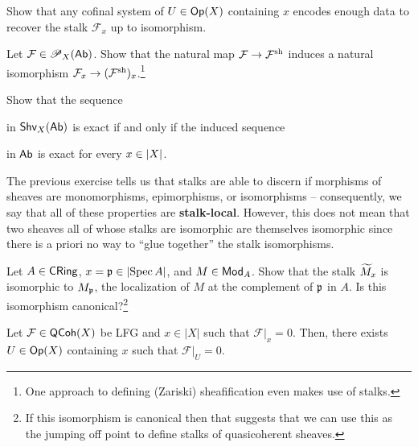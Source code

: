 \documentclass[11pt]{article}
\renewcommand{\F}{\mathcal{F}}
\newcommand{\G}{\mathcal{G}}
\begin{document}
\begin{exercise}
Show that any cofinal system of $U\in\operatorname{\mathsf{Op}}(X)$ containing $x$ encodes enough data to recover the stalk $\F_x$ up to isomorphism.
\end{exercise}

\begin{exercise}
Let $\F\in\Pre_X(\Ab)$. Show that the natural map $\F\to\F^{\sh}$ induces a natural isomorphism $\F_x\to(\F^{\sh})_x$.\footnote{One approach to defining (Zariski) sheafification even makes use of stalks.}
\end{exercise}

\begin{exercise}
Show that the sequence
\begin{center}
\end{center}
in $\operatorname{\mathsf{Shv}}_X(\operatorname{\mathsf{Ab}})$ is exact if and only if the induced sequence
\begin{center}
\end{center}
in $\operatorname{\mathsf{Ab}}$ is exact for every $x\in\left\lvert X\right\rvert$.
\end{exercise}

\begin{remark}
The previous exercise tells us that stalks are able to discern if morphisms of sheaves are monomorphisms, epimorphisms, or isomorphisms -- consequently, we say that all of these properties are \textbf{stalk-local}. However, this does not mean that two sheaves all of whose stalks are isomorphic are themselves isomorphic since there is a priori no way to ``glue together'' the stalk isomorphisms.
\end{remark}

\begin{exercise}
Let $A\in\operatorname{\mathsf{CRing}}$, $x=\mathfrak{p}\in\left\lvert\operatorname{Spec} A\right\rvert$, and $M\in\operatorname{\mathsf{Mod}}_A$. Show that the stalk $\widetilde{M}_x$ is isomorphic to $M_{\mathfrak{p}}$, the localization of $M$ at the complement of $\mathfrak{p}$ in $A$. Is this isomorphism canonical?\footnote{If this isomorphism is canonical then that suggests that we can use this as the jumping off point to define stalks of quasicoherent sheaves.}
\end{exercise}

\begin{theorem}
Let $\F\in\QCoh(X)$ be LFG and $x\in|X|$ such that $\F|_x=0$. Then, there exists $U\in\operatorname{\mathsf{Op}}(X)$ containing $x$ such that $\F|_U=0$.
\end{theorem}
\end{document}
